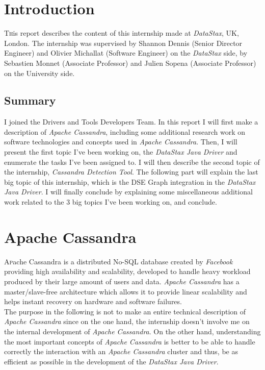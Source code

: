 \documentclass[a4paper]{report}
\newcommand\blankpage{%
    \null
    \thispagestyle{empty}%
    \addtocounter{page}{-1}%
    \newpage}
\newcommand{\ds}{\emph{DataStax\xspace}}
\newcommand{\djd}{\emph{DataStax Java Driver\xspace}}
\newcommand{\ca}{\emph{Apache Cassandra\xspace}}
\newcommand{\cdt}{\emph{Cassandra Detection Tool\xspace}}
\begin{document}
\afterpage{\blankpage}

\tableofcontents
\afterpage{\blankpage}



\chapter{Introduction}

\pagestyle{plain}
\lettrine[nindent=0em,lines=3]{T} his report describes the content of this internship made at \ds{}, UK, London. The internship was supervised by Shannon Dennis (Senior Director Engineer) and Olivier Michallat (Software Engineer) on the \ds{} side, by Sebastien Monnet (Associate Professor) and Julien Sopena (Associate Professor) on the University side.\\
\section{Summary}
I joined the Drivers and Tools Developers Team. In this report I will first make a description of \ca{}, including some additional research work on software technologies and concepts used in \ca{}. Then, I will present the first topic I've been working on, the \djd{} and enumerate the tasks I've been assigned to. I will then describe the second topic of the internship, \cdt{}. The following part will explain the last big topic of this internship, which is the DSE Graph integration in the \djd{}. I will finally conclude by explaining some miscellaneous additional work related to the 3 big topics I've been working on, and conclude.

\chapter{Apache Cassandra}
\lettrine[nindent=0em,lines=3]{A} pache Cassandra is a distributed No-SQL database created by \emph{Facebook} providing high availability and scalability, developed to handle heavy workload produced by their large amount of users and data. \ca{} has a master/slave-free architecture which allows it to provide linear scalability and helps instant recovery on hardware and software failures.\\
The purpose in the following is not to make an entire technical description of \ca{} since on the one hand, the internship doesn't involve me on the internal development of \ca{}. On the other hand, understanding the most important concepts of \ca{} is better to be able to handle correctly the interaction with an \ca{} cluster and thus, be as efficient as possible in the development of the \djd{}.
\end{document}
